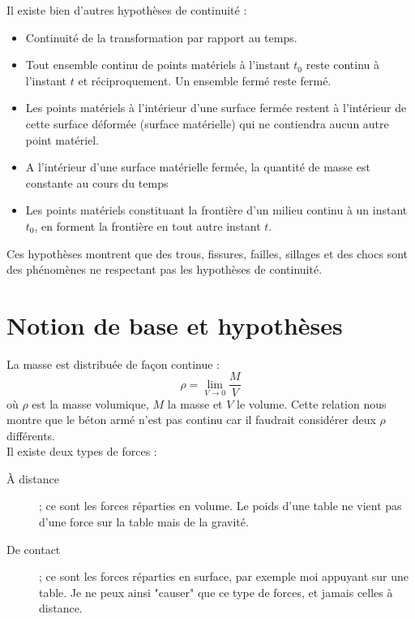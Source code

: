     Il existe bien d'autres hypothèses de continuité :
    \begin{itemize}
    \item Continuité de la transformation par rapport au temps.
    \item Tout ensemble continu de points matériels à l'instant $t_0$ reste continu à l'instant $t$
    et réciproquement. Un ensemble fermé reste fermé.
    \item Les points matériels à l'intérieur d'une surface fermée restent à l'intérieur de cette
    surface déformée (surface matérielle) qui ne contiendra aucun autre point matériel.
    \item A l'intérieur d'une surface matérielle fermée, la quantité de masse est constante au cours
    du temps
    \item Les points matériels constituant la frontière d'un milieu continu à un instant $t_0$, en 
    forment la frontière en tout autre instant $t$.
    \end{itemize}
    
    Ces hypothèses montrent que des trous, fissures, failles, sillages et des chocs sont des phénomènes
    ne respectant pas les hypothèses de continuité.
    
\section*{Notion de base et hypothèses}
    La masse est distribuée de façon continue : 
    \begin{equation}
     \rho = \lim\limits_{V \rightarrow 0} \frac{M}{V}
    \end{equation}
    où $\rho$ est la masse volumique, $M$ la masse et $V$ le volume. Cette relation nous montre que
    le béton armé n'est pas continu car il faudrait considérer deux $\rho$ différents.\\
    
    Il existe deux types de forces :
    \begin{description}
    \item[À distance]; ce sont les forces réparties en volume. Le poids d'une table ne vient pas d'une
    force sur la table mais de la gravité.
    \item[De contact]; ce sont les forces réparties en surface, par exemple moi appuyant sur une
    table. Je ne peux ainsi "causer" que ce type de forces, et jamais celles à distance.
     \end{description}
     

